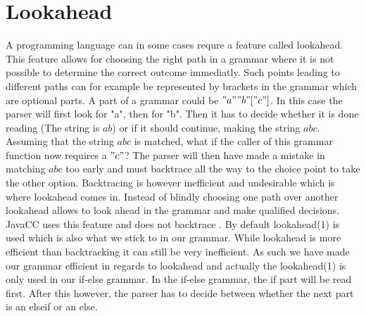 \section{Lookahead}
A programming language can in some cases requre a feature called lookahead. This feature allows for choosing the right path in a grammar where it is not possible to determine the correct outcome immediatly. Such points leading to different paths can for example be represented by brackets in the grammar which are optional parts. A part of a grammar could be $"a" "b" ["c"]$. In this case the parser will first look for "a", then for "b". Then it has to decide whether it is done reading (The string is $ab$) or if it should continue, making the string $abc$. Assuming that the string $abc$ is matched, what if the caller of this grammar function now requires a $"c"$? The parser will then have made a mistake in matching $abc$ too early and must backtrace all the way to the choice point to take the other option. Backtracing is however inefficient and undesirable which is where lookahead comes in. Instead of blindly choosing one path over another lookahead allows to look ahead in the grammar and make qualified decisions. JavaCC uses this feature and does not backtrace . By default lookahead(1) is used which is also what we stick to in our grammar. While lookahead is more efficient than backtracking it can still be very inefficient. As such we have made our grammar efficient in regards to lookahead and actually the lookahead(1) is only used in our if-else grammar. In the if-else grammar, the if part will be read first. After this however, the parser has to decide between whether the next part is an elseif or an else.
